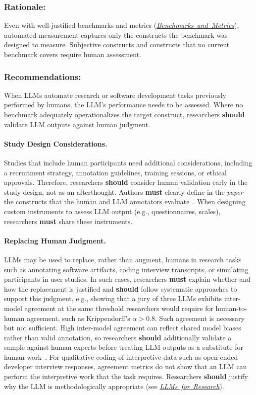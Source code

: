\documentclass[smallextended]{svjour3}
\newcommand{\must}{\textbf{must}\xspace}
\newcommand{\should}{\textbf{should}\xspace}
\newcommand{\paper}{\emph{paper}\xspace}
\newcommand{\paper}{\emph{paper}\xspace}
\newcommand{\llmsforresearcher}{\hyperref[sec:llms-as-tools-for-software-engineering-researchers]{\mbox{\emph{LLMs for Research}}}\xspace}
\newcommand{\llmsforresearcher}{\href{/study-types/llms-for-research/}{\emph{LLMs for Research}}\xspace}
\newcommand{\benchmarksmetrics}{\hyperref[sec:use-suitable-baselines-benchmarks-and-metrics]{\mbox{\emph{Benchmarks and Metrics}}}\xspace}
\newcommand{\benchmarksmetrics}{\href{/guidelines/benchmarks-metrics/}{\emph{Benchmarks and Metrics}}\xspace}
\newcommand{\guidelinesubsubsection}[1]{\subsubsection{\bfseries #1:}}
\newcommand{\guidelineparagraph}[1]{\paragraph{#1.}}
\newcommand{\guidelinesubsubsection}[1]{\subsubsection{#1}}
\newcommand{\guidelineparagraph}[1]{\paragraph{#1}}
\begin{document}
\guidelinesubsubsection{Rationale}

Even with well-justified benchmarks and metrics (\benchmarksmetrics), automated measurement captures only the constructs the benchmark was designed to measure.
Subjective constructs and constructs that no current benchmark covers require human assessment.

\guidelinesubsubsection{Recommendations}

When LLMs automate research or software development tasks previously performed by humans, the LLM's performance needs to be assessed.
Where no benchmark adequately operationalizes the target construct, researchers \should validate LLM outputs against human judgment.

\guidelineparagraph{Study Design Considerations}
Studies that include human participants need additional considerations, including a recruitment strategy, annotation guidelines, training sessions, or ethical approvals.
Therefore, researchers \should consider human validation early in the study design, not as an afterthought.
Authors \must clearly define in the \paper the constructs that the human and LLM annotators evaluate~\cite{DBLP:conf/ease/RalphT18}.
When designing custom instruments to assess LLM output (e.g., questionnaires, scales), researchers \must share these instruments.

\guidelineparagraph{Replacing Human Judgment}
LLMs may be used to replace, rather than augment, humans in research tasks such as annotating software artifacts, coding interview transcripts, or simulating participants in user studies. In such cases, researchers \must explain whether and how the replacement is justified and \should follow systematic approaches to support this judgment, e.g., showing that a jury of three LLMs exhibits inter-model agreement at the same threshold researchers would require for human-to-human agreement, such as Krippendorff's $\alpha>0.8$. Such agreement is necessary but not sufficient. High inter-model agreement can reflect shared model biases rather than valid annotation, so researchers \should additionally validate a sample against human experts before treating LLM outputs as a substitute for human work~\cite{DBLP:conf/msr/AhmedDTP25, Krippendorff2018}. For qualitative coding of interpretive data such as open-ended developer interview responses, agreement metrics do not show that an LLM can perform the interpretive work that the task requires. Researchers \should justify why the LLM is methodologically appropriate (see \llmsforresearcher).
\end{document}
